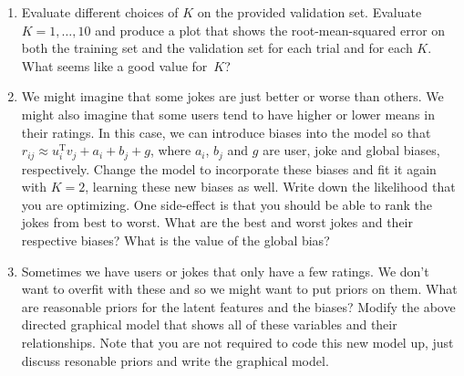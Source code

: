 \documentclass[submit]{harvardml}
\theoremstyle{plain}
\begin{document}
\begin{problem}
\begin{enumerate}[label=(\alph*)]
\item Evaluate different choices of $K$ on the provided validation set. Evaluate $K = 1,
\ldots, 10$ and produce a plot that shows the root-mean-squared error on both
the training set and the validation set for each trial and for each $K$. What
seems like a good value for~$K$?

 \item We might imagine that some jokes are just better or worse than others.
We might also imagine that some users tend to have higher or lower means in
their ratings. In this case, we can introduce biases into the model so that
$r_{ij} \approx u_i^\text{T} v_j + a_i + b_j + g$, where $a_i$, $b_j$ and $g$ are user,
joke and global biases, respectively.  Change the model to incorporate these
biases and fit it again with $K=2$, learning these new biases as well. Write
down the likelihood that you are optimizing. One side-effect is that you should
be able to rank the jokes from best to worst. What are the best and worst jokes
and their respective biases?  What is the value of the global bias?

 \item Sometimes we have users or jokes that only have a few ratings. We don't
want to overfit with these and so we might want to put priors on them. What are
reasonable priors for the latent features and the biases? Modify the above directed
graphical model that shows all of these variables and their relationships.
Note that you are not required to code this new model up, just discuss
resonable priors and write the graphical model.
\end{enumerate}
\end{problem}
\end{document}
